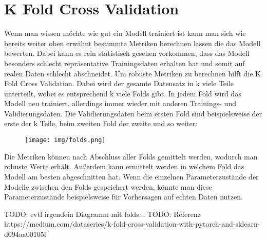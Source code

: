 \documentclass[11pt, a4paper]{article}
\begin{document}
\section{K Fold Cross Validation}
Wenn man wissen möchte wie gut ein Modell trainiert ist kann man sich wie bereits weiter oben erwähnt bestimmte Metriken berechnen lassen die das Modell bewerten. Dabei kann es rein statistisch gesehen vorkommen, dass das Modell besonders schlecht repräsentative Trainingsdaten erhalten hat und somit auf realen Daten schlecht abschneidet. Um robuste Metriken zu berechnen hilft die K Fold Cross Validation. Dabei wird der gesamte Datensatz in k viele Teile unterteilt, wobei es entsprechend k viele Folds gibt. In jedem Fold wird das Modell neu trainiert, allerdings immer wieder mit anderen Trainings- und Validierungsdaten. Die Validierungsdaten beim ersten Fold sind beispielsweise der erste der k Teile, beim zweiten Fold der zweite und so weiter:
\begin{figure}[h]
\centering
\texttt{[image: img/folds.png]}
\end{figure}
Die Metriken können nach Abschluss aller Folds gemittelt werden, wodurch man robuste Werte erhält. Außerdem kann ermittelt werden in welchem Fold das Modell am besten abgeschnitten hat. Wenn die einzelnen Parameterzustände der Modelle zwischen den Folds gespeichert werden, könnte man diese Parameterzustände beispielsweise für Vorhersagen auf echten Daten nutzen.

TODO: evtl irgendein Diagramm mit folds...
TODO: Referenz https://medium.com/dataseries/k-fold-cross-validation-with-pytorch-and-sklearn-d094aa00105f
\end{document}
